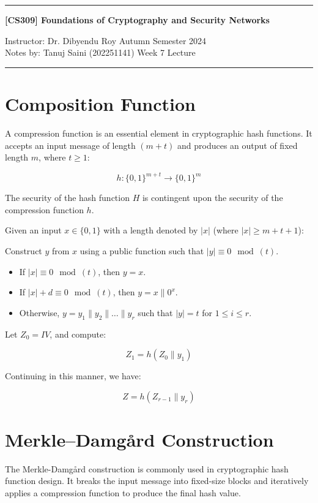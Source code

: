 \documentclass{article}
\begin{document}
\noindent
\rule{\textwidth}{1pt}
\begin{center}
{\bf [CS309] Foundations of Cryptography and Security Networks}
\end{center}
Instructor: Dr. Dibyendu Roy \hfill Autumn Semester 2024\\
Notes by: Tanuj Saini (202251141) \hfill Week 7 Lecture
\\
\rule{\textwidth}{1pt}

\section{Composition Function}

A compression function is an essential element in cryptographic hash functions. It accepts an input message of length $(m + t)$ and produces an output of fixed length $m$, where $t \geq 1$:

\[ h : \{0, 1\}^{m+t} \rightarrow \{0, 1\}^m \]

The security of the hash function $H$ is contingent upon the security of the compression function $h$.

Given an input $x \in \{0, 1\}$ with a length denoted by $|x|$ (where $|x| \geq m + t + 1$):

Construct $y$ from $x$ using a public function such that $|y| \equiv 0 \mod (t)$.
\begin{itemize}
    \item If $|x| \equiv 0 \mod (t)$, then $y = x$.
    \item If $|x| + d \equiv 0 \mod (t)$, then $y = x \parallel 0^x$.
    \item Otherwise, $y = y_1 \parallel y_2 \parallel \ldots \parallel y_r$ such that $|y| = t$ for $1 \leq i \leq r$.
\end{itemize}

Let $Z_0 = IV$, and compute:

\[ Z_1 = h(Z_0 \parallel y_1) \]

Continuing in this manner, we have:

\[ Z = h(Z_{r-1} \parallel y_r) \]

\section{Merkle--Damg\r{a}rd Construction}

The Merkle-Damg\r{a}rd construction is commonly used in cryptographic hash function design. It breaks the input message into fixed-size blocks and iteratively applies a compression function to produce the final hash value.
\end{document}
